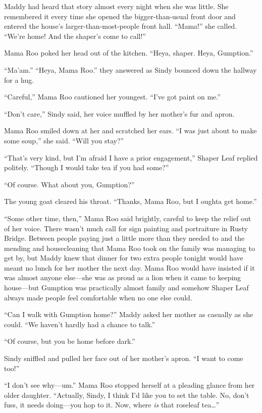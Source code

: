 \documentclass[10pt]{article}
\begin{document}
Maddy had heard that story almost every night when she was little. She
remembered it every time she opened the bigger-than-usual front door and
entered the house's larger-than-most-people front hall. ``Mama!'' she
called. ``We're home! And the shaper's come to call!''

Mama Roo poked her head out of the kitchen. ``Heya, shaper. Heya,
Gumption.''

``Ma'am.'' ``Heya, Mama Roo.'' they answered as Sindy bounced down the
hallway for a hug.

``Careful,'' Mama Roo cautioned her youngest. ``I've got paint on me.''

``Don't care,'' Sindy said, her voice muffled by her mother's fur and
apron.

Mama Roo smiled down at her and scratched her ears. ``I was just about
to make some soup,'' she said. ``Will you stay?''

``That's very kind, but I'm afraid I have a prior engagement,'' Shaper
Leaf replied politely. ``Though I would take tea if you had some?''

``Of course. What about you, Gumption?''

The young goat cleared his throat. ``Thanks, Mama Roo, but I oughta get
home.''

``Some other time, then,'' Mama Roo said brightly, careful to keep the
relief out of her voice. There wasn't much call for sign painting and
portraiture in Rusty Bridge. Between people paying just a little more
than they needed to and the mending and housecleaning that Mama Roo took
on the family was managing to get by, but Maddy knew that dinner for two
extra people tonight would have meant no lunch for her mother the next
day. Mama Roo would have insisted if it was almost anyone else---she was
as proud as a lion when it came to keeping house---but Gumption was
practically almost family and somehow Shaper Leaf always made people
feel comfortable when no one else could.

``Can I walk with Gumption home?'' Maddy asked her mother as casually as
she could. ``We haven't hardly had a chance to talk.''

``Of course, but you be home before dark.''

Sindy sniffled and pulled her face out of her mother's apron. ``I want
to come too!''

``I don't see why---um.'' Mama Roo stopped herself at a pleading glance
from her older daughter. ``Actually, Sindy, I think I'd like you to set
the table. No, don't fuss, it needs doing---you hop to it. Now, where
\emph{is} that roseleaf tea\ldots{}''
\end{document}
